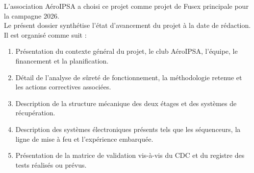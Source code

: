 L'association AéroIPSA a choisi ce projet comme projet de \gls{Fusex} principale pour la campagne 2026.\\

Le présent dossier synthétise l'état d'avancement du projet à la date de rédaction. Il est organisé comme suit :
\begin{enumerate}
    \item Présentation du contexte général du projet, le club AéroIPSA, l'équipe, le financement et la planification.
    \item Détail de l'analyse de sûreté de fonctionnement, la méthodologie retenue et les actions correctives associées.
    \item Description de la structure mécanique des deux étages et des systèmes de récupération.
    \item Description des systèmes électroniques présents tels que les séquenceurs, la ligne de mise à feu et l'expérience
    embarquée.
    \item Présentation de la matrice de validation vis-à-vis du \acrshort{CDC} et du registre des tests réalisés ou
    prévus.
\end{enumerate}

\newpage
